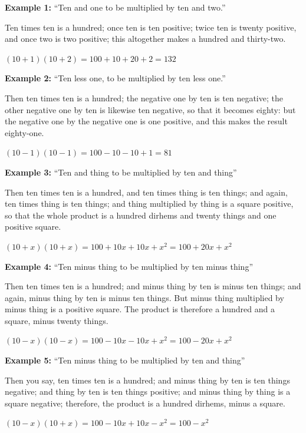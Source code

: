 \documentclass[11pt,a4paper,openany,oneside]{book}
\begin{document}
\begin{minipage}[t]{0.48\textwidth}
\raggedright

\textbf{Example 1:} ``Ten and one to be multiplied by ten and two.''

Ten times ten is a hundred; once ten is ten positive; twice ten is twenty positive, and once two is two positive; this altogether makes a hundred and thirty-two.

$(10 + 1)(10 + 2) = 100 + 10 + 20 + 2 = 132$

\vspace{0.3cm}

\textbf{Example 2:} ``Ten less one, to be multiplied by ten less one.''

Then ten times ten is a hundred; the negative one by ten is ten negative; the other negative one by ten is likewise ten negative, so that it becomes eighty: but the negative one by the negative one is one positive, and this makes the result eighty-one.

$(10 - 1)(10 - 1) = 100 - 10 - 10 + 1 = 81$

\vspace{0.3cm}

\textbf{Example 3:} ``Ten and thing to be multiplied by ten and thing''

Then ten times ten is a hundred, and ten times thing is ten things; and again, ten times thing is ten things; and thing multiplied by thing is a square positive, so that the whole product is a hundred dirhems and twenty things and one positive square.

$(10 + x)(10 + x) = 100 + 10x + 10x + x^2 = 100 + 20x + x^2$

\vspace{0.3cm}

\textbf{Example 4:} ``Ten minus thing to be multiplied by ten minus thing''

Then ten times ten is a hundred; and minus thing by ten is minus ten things; and again, minus thing by ten is minus ten things. But minus thing multiplied by minus thing is a positive square. The product is therefore a hundred and a square, minus twenty things.

$(10 - x)(10 - x) = 100 - 10x - 10x + x^2 = 100 - 20x + x^2$

\vspace{0.3cm}

\textbf{Example 5:} ``Ten minus thing to be multiplied by ten and thing''

Then you say, ten times ten is a hundred; and minus thing by ten is ten things negative; and thing by ten is ten things positive; and minus thing by thing is a square negative; therefore, the product is a hundred dirhems, minus a square.

$(10 - x)(10 + x) = 100 - 10x + 10x - x^2 = 100 - x^2$

\end{minipage}
\vspace{0.3cm}
\end{document}
